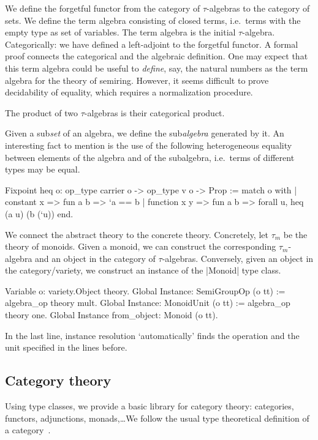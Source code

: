 \documentclass[a4paper,10pt,runningheads]{llncs}
\begin{document}
We define the forgetful functor from the category of $\tau$-algebras to the category of sets.
We define the term algebra consisting of closed terms, i.e.\ terms with the empty type as set of
variables. The term algebra is the initial $\tau$-algebra. Categorically: we have defined a
left-adjoint to the forgetful functor.
A formal proof connects the categorical and the algebraic definition.
One may expect that this term algebra could be useful to
\emph{define}, say, the natural numbers as the term algebra for the theory of semiring. However, it
seems difficult to prove decidability of equality, which requires a normalization procedure.

The product of two $\tau$-algebras is their categorical product.

Given a sub\emph{set} of an algebra, we define the sub\emph{algebra} generated by it.
An interesting fact to mention is the use of the following heterogeneous equality between
elements of the algebra and of the subalgebra, i.e.\ terms of different types may be equal.
\begin{code}
  Fixpoint heq {o}: op_type carrier o -> op_type v o -> Prop :=
    match o with
    | constant x => fun a b => `a == b
    | function x y => fun a b => forall u, heq (a u) (b (`u))
    end.
\end{code}

We connect the abstract theory to the concrete theory. Concretely, let $\tau_m$ be the theory
of monoids. Given a monoid, we can construct the corresponding $\tau_m$-algebra and an
object in the category of $\tau$-algebras. Conversely, given an object in the category/variety, we
construct an instance of the |Monoid| type class.
\begin{code}
Variable o: variety.Object theory.
Global Instance: SemiGroupOp (o tt) := algebra_op theory mult.
Global Instance: MonoidUnit (o tt) := algebra_op theory one.
Global Instance from_object: Monoid (o tt).
\end{code}
In the last line, instance resolution `automatically' finds the operation and the unit specified in
the lines before.

\subsection{Category theory}\label{cats}
Using type classes, we provide a basic library for category theory: categories, functors,
adjunctions, monads,\ldots We follow the usual type theoretical definition of a
category~\cite{saibi1995constructive}.
\end{document}
